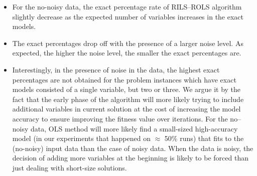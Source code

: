 \documentclass{bmcart}
\begin{document}
\begin{itemize}
	\item For the no-noisy data, the exact percentage rate of \textsc{RILS}--\textsc{ROLS} algorithm  slightly decrease as the expected number of variables increases in the exact models. 
	\item The exact percentages drop off with the presence of a larger noise level. As expected, the higher the noise level, the smaller the exact percentages are.
	\item Interestingly, in the presence of noise in the data, the highest exact percentages are not obtained for the problem instances which have exact models consisted of a single variable, but two or three. We argue it by the fact that the early phase of the algorithm will more likely trying to include additional variables in current solution at the cost of increasing the model accuracy to ensure improving the fitness value over iterations. For the no--noisy data, OLS method will more likely find a small-sized high-accuracy model (in our experiments that happened on $\approx$ 50\% runs) that fits to the (no-noisy) input data than the case of noisy data. When the data is noisy, the decision of adding more variables at the beginning is likely to be forced than just dealing with short-size solutions. %
\end{itemize}
\end{document}

